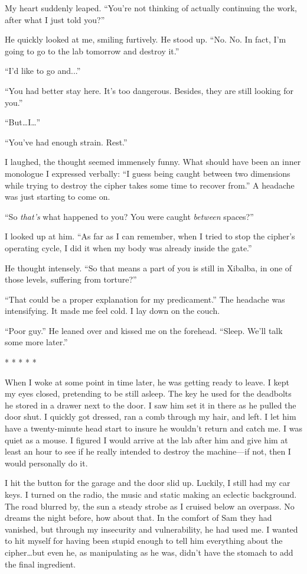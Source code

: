 My heart suddenly leaped. ``You're not thinking of actually continuing
the work, after what I just told you?''

He quickly looked at me, smiling furtively. He stood up. ``No. No. In
fact, I'm going to go to the lab tomorrow and destroy it.''

``I'd like to go and...''

``You had better stay here. It's too dangerous. Besides, they are still
looking for you.''

``But\ldots I\ldots''

``You've had enough strain. Rest.''

I laughed, the thought seemed immensely funny. What should have been an
inner monologue I expressed verbally: ``I guess being caught between two
dimensions while trying to destroy the cipher takes some time to recover
from.'' A headache was just starting to come on.

``So \emph{that's} what happened to you? You were caught \emph{between}
spaces?''

I looked up at him. ``As far as I can remember, when I tried to stop the
cipher's operating cycle, I did it when my body was already inside the
gate.''

He thought intensely. ``So that means a part of you is still in Xibalba,
in one of those levels, suffering from torture?''

``That could be a proper explanation for my predicament.'' The headache
was intensifying. It made me feel cold. I lay down on the couch.

``Poor guy.'' He leaned over and kissed me on the forehead. ``Sleep.
We'll talk some more later.''

* * * * *

When I woke at some point in time later, he was getting ready to leave.
I kept my eyes closed, pretending to be still asleep. The key he used
for the deadbolts he stored in a drawer next to the door. I saw him set
it in there as he pulled the door shut. I quickly got dressed, ran a
comb through my hair, and left. I let him have a twenty-minute head
start to insure he wouldn't return and catch me. I was quiet as a mouse.
I figured I would arrive at the lab after him and give him at least an
hour to see if he really intended to destroy the machine---if not, then
I would personally do it.

I hit the button for the garage and the door slid up. Luckily, I still
had my car keys. I turned on the radio, the music and static making an
eclectic background. The road blurred by, the sun a steady strobe as I
cruised below an overpass. No dreams the night before, how about that.
In the comfort of Sam they had vanished, but through my insecurity and
vulnerability, he had used me. I wanted to hit myself for having been
stupid enough to tell him everything about the cipher\ldots but even he,
as manipulating as he was, didn't have the stomach to add the final
ingredient.


